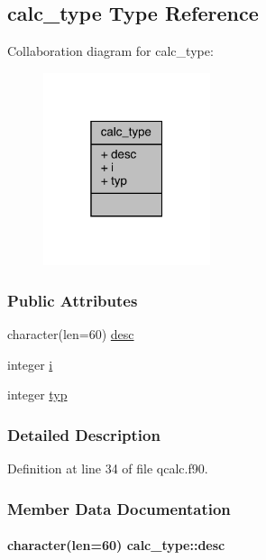 \hypertarget{structcalc__type}{\subsection{calc\-\_\-type Type Reference}
\label{structcalc__type}
}


Collaboration diagram for calc\-\_\-type\-:
\nopagebreak
\begin{figure}[H]
\begin{center}
\leavevmode
\includegraphics[width=139pt]{structcalc__type__coll__graph}
\end{center}
\end{figure}
\subsubsection*{Public Attributes}
\begin{DoxyCompactItemize}
\item 
character(len=60) \hyperlink{structcalc__type_ae59927d51da49ed953e75139df0bc97d}{desc}
\item 
integer \hyperlink{structcalc__type_a30aaeaab9272f5ff5cdaeb3c3fe8c8bf}{i}
\item 
integer \hyperlink{structcalc__type_adf6e4b278e6edf39f7a833d329f1f493}{typ}
\end{DoxyCompactItemize}


\subsubsection{Detailed Description}


Definition at line 34 of file qcalc.\-f90.



\subsubsection{Member Data Documentation}
\hypertarget{structcalc__type_ae59927d51da49ed953e75139df0bc97d}{
\paragraph[{desc}]{\setlength{\rightskip}{0pt plus 5cm}character(len=60) calc\-\_\-type\-::desc}}\label{structcalc__type_ae59927d51da49ed953e75139df0bc97d}


